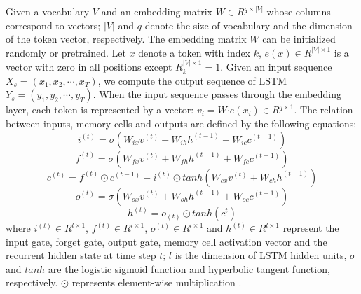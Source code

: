 \documentclass{llncs}
\begin{document}
Given a vocabulary $V$ and an embedding matrix $W\in R^{{q}\times { |V|} }$  whose columns correspond to vectors; $|V|$ and $q$ denote the size of vocabulary  and the dimension of the token vector, respectively. The embedding matrix $W$ can be initialized randomly or pretrained. Let  $x$ denote a token with index $k$, $e(x) \in R^{|V| \times {1}}$ is a vector with zero in all positions except $R^{{|V| \times {1}}}_{k}=1$.
Given an input sequence $X_{s} = (x_{1},x_{2},\cdots,x_{T}) $, we compute the output sequence of LSTM $Y_{s} = (y_{1},y_{2},\cdots,y_{T}) $. When the input sequence passes through the embedding layer, each token is represented by a vector: $v_{i}= W \bm\cdot e(x_{i}) \in R^{q \times 1}$.  The relation between inputs, memory cells and outputs are defined by the following equations:
\begin{equation}
i^{(t)} = \sigma (W_{ix} v^{(t)} + W_{ih}  h^{(t-1)} + W_{ic}  c^{(t-1)})
\label{eq:pathnode}
\end{equation}
\begin{equation}
f^{(t)} = \sigma (W_{fx}  v^{(t)} +  W_{fh}  h^{(t-1)} + W_{fc}  c^{(t-1)})
\label{eq:pathnode}
\end{equation}
\begin{equation}
c^{(t)} = f^{(t)} \odot c^{(t-1)} + i^{(t)} \odot tanh(W_{cx}  v^{(t)} + W_{ch}  h^{(t-1)})
\label{eq:pathnode}
\end{equation}
\begin{equation}
o^{(t)} = \sigma (W_{ox}  v^{(t)} + W_{oh}  h^{(t-1)} + W_{oc}  c^{(t-1)})
\label{eq:pathnode}
\end{equation}
\begin{equation}
h^{(t)}=o_{(t)}\odot tanh(c^{t})
\label{eq:pathnode}
\end{equation}
where $i^{(t)}\in R^{l\times 1}$, $f^{(t)}\in R^{l\times 1}$, $o^{(t)}\in R^{l\times 1}$  and $h^{(t)}\in R^{l\times 1}$ represent the input gate, forget gate, output gate, memory cell activation vector and the recurrent hidden state at time step $t$; $l$ is the dimension of LSTM hidden units, $\sigma$ and $tanh$ are the logistic sigmoid function and hyperbolic tangent function, respectively. 
 $\odot$ represents element-wise multiplication \cite{Hochreiter1997Long}.
\end{document}

